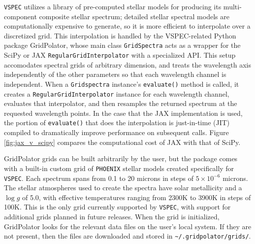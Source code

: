 \documentclass[linenumbers,preprint,authoryear]{elsarticle}
\newcommand{\teff}{$T_{\rm eff}$}
\newcommand{\TJ}[1]{\textcolor{tedcommentcolor}{#1}}
\newcommand{\vspec}[1]{\texttt{VSPEC}#1}
\begin{document}
\vspec{} utilizes a library of pre-computed stellar models for producing its multi-component composite stellar spectrum; detailed stellar spectral models are computationally expensive to generate, so it is more efficient to interpolate over a discretized grid. This interpolation is handled by the VSPEC-related Python package GridPolator, whose main class \texttt{GridSpectra} acts as a wrapper for the SciPy \citep{virtanen2020} or JAX \citep{bradbury2018} \texttt{RegularGridInterpolator} with a specialized API. This setup accomodates spectral grids of arbitrary dimension, and treats the wavelength axis independently of the other parameters so that each wavelength channel is independent. When a \texttt{Gridspectra} instance's \texttt{evaluate()} method is called, it creates a \texttt{RegularGridInterpolator} instance for each wavelength channel, evaluates that interpolator, and then resamples the returned spectrum at the requested wavelength points. In the case that the JAX implementation is used, the portion of \texttt{evaluate()} that does the interpolation is just-in-time (JIT) compiled to dramatically improve performance on subsequent calls. Figure \ref{fig:jax_v_scipy} compares the computational cost of JAX with that of SciPy.

GridPolator grids can be built arbitrarily by the user, but the package comes with a built-in custom grid of \texttt{PHOENIX} stellar models \citep{allard1994,hauschildt1999,husser2013} created specifically for \vspec{}. Each spectrum spans from 0.1 to 20 microns in steps of $5\times10^{-6}$ microns. The stellar atmospheres used to create the spectra have solar metallicity and a $\log{g}$ of 5.0, with effective temperatures ranging from 2300K to 3900K in steps of 100K. This is the only grid currently supported by \vspec{}, with support for additional grids planned in future releases.
When the grid is initialized, GridPolator looks for the relevant data files on the user's local system. If they are not present, then the files are downloaded and stored in \texttt{\textasciitilde /.gridpolator/grids/}. 
\end{document}
